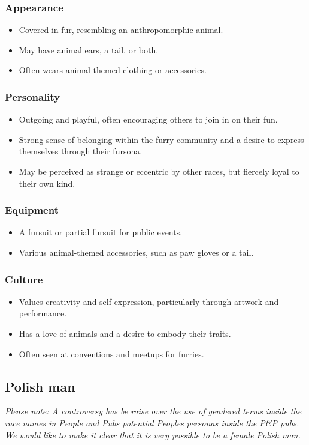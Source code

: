 \documentclass{book}
\begin{document}
\subsubsection{Appearance}
\begin{itemize}
    \item Covered in fur, resembling an anthropomorphic animal.
    \item May have animal ears, a tail, or both.
    \item Often wears animal-themed clothing or accessories.
\end{itemize}
\subsubsection{Personality}
\begin{itemize}
\item Outgoing and playful, often encouraging others to join in on their fun.
\item Strong sense of belonging within the furry community and a desire to express themselves through their fursona.
\item May be perceived as strange or eccentric by other races, but fiercely loyal to their own kind.
\end{itemize}
\subsubsection{Equipment}
\begin{itemize}
    \item A fursuit or partial fursuit for public events.
    \item Various animal-themed accessories, such as paw gloves or a tail.
\end{itemize}
\subsubsection{Culture}
\begin{itemize}
    \item Values creativity and self-expression, particularly through artwork and performance.
    \item Has a love of animals and a desire to embody their traits.
    \item Often seen at conventions and meetups for furries.
\end{itemize}

\subsection{Polish man}
\linebreak
\linebreak
\emph{Please note: A controversy has be raise over the use of gendered terms inside the race names in People and Pubs potential Peoples personas inside the P&P pubs. We would like to make it clear that it is very possible to be a female Polish man.}
\linebreak
\linebreak
\end{document}
